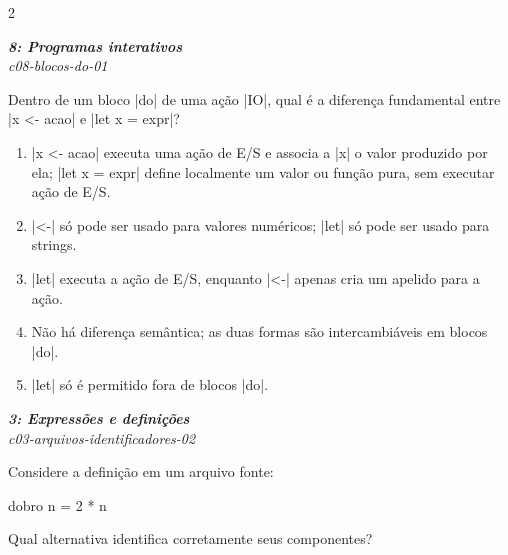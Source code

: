 \documentclass[a4paper,10pt,brazil]{article}
\begin{document}
\begin{multicols}{2}
\begin{enumerate}
\end{enumerate}

\begin{flushright}
  \footnotesize
  \textit{\textbf{8: Programas interativos}}\\
  \textit{c08-blocos-do-01}\\

\end{flushright}
Dentro de um bloco \haskellinline|do| de uma ação \haskellinline|IO|, qual é a diferença fundamental entre \haskellinline|x <- acao| e \haskellinline|let x = expr|?

\begin{enumerate}
  \item \haskellinline|x <- acao| executa uma ação de E/S e associa a \haskellinline|x| o valor produzido por ela; \haskellinline|let x = expr| define localmente um valor ou função pura, sem executar ação de E/S.

  \item \haskellinline|<-| só pode ser usado para valores numéricos; \haskellinline|let| só pode ser usado para strings.

  \item \haskellinline|let| executa a ação de E/S, enquanto \haskellinline|<-| apenas cria um apelido para a ação.

  \item Não há diferença semântica; as duas formas são intercambiáveis em blocos \haskellinline|do|.

  \item \haskellinline|let| só é permitido fora de blocos \haskellinline|do|.


\end{enumerate}

\begin{flushright}
  \footnotesize
  \textit{\textbf{3: Expressões e definições}}\\
  \textit{c03-arquivos-identificadores-02}\\

\end{flushright}
Considere a definição em um arquivo fonte:

\begin{haskellcode}
dobro n = 2 * n
\end{haskellcode}

Qual alternativa identifica corretamente seus componentes?


\end{multicols}
\end{document}
